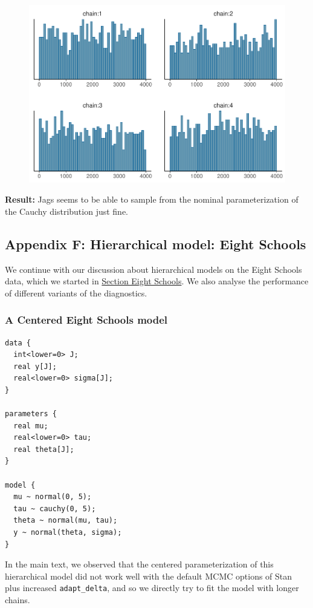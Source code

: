 \documentclass[american,]{article}
\begin{document}
\begin{figure}[t]
  \centering
  \includegraphics[width=0.6\linewidth]{graphics/hist-jags-nom-1.pdf}
\end{figure}

\textbf{Result:} Jags seems to be able to sample from the nominal
parameterization of the Cauchy distribution just fine.

\hypertarget{AppendixF}{%
\subsection*{Appendix F: Hierarchical model: Eight
Schools}\label{AppendixF}}

We continue with our discussion about hierarchical models on the Eight
Schools data, which we started in
\protect\hyperlink{eightschools}{Section Eight Schools}. We also analyse
the performance of different variants of the diagnostics.

\hypertarget{a-centered-eight-schools-model-1}{%
\subsubsection*{A Centered Eight Schools
model}\label{a-centered-eight-schools-model-1}}

\begin{verbatim}
data {
  int<lower=0> J;
  real y[J];
  real<lower=0> sigma[J];
}

parameters {
  real mu;
  real<lower=0> tau;
  real theta[J];
}

model {
  mu ~ normal(0, 5);
  tau ~ cauchy(0, 5);
  theta ~ normal(mu, tau);
  y ~ normal(theta, sigma);
}
\end{verbatim}

In the main text, we observed that the centered parameterization of this
hierarchical model did not work well with the default MCMC options of
Stan plus increased \texttt{adapt\_delta}, and so we directly try to fit
the model with longer chains.
\end{document}
